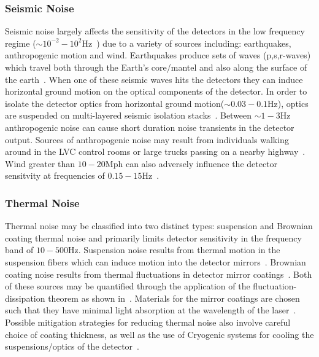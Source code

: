 \subsubsection{Seismic Noise}
%
Seismic noise largely affects the sensitivity of the detectors in the 
low frequency regime ($\sim 10^{-2} -
10^2$Hz~\cite{2012CQGra..29e5006M}) due to a variety of sources 
including: earthquakes, anthropogenic motion and wind. Earthquakes produce 
sets of 
waves (p,s,r-waves) which travel both through the Earth's core/mantel and 
also along the surface of the earth~\cite{Pavlis2003}. 
When one of these seismic waves
hits the detectors they can induce horizontal ground motion on the 
optical components of the detector. In order to isolate the detector 
optics from horizontal ground motion($\sim 0.03 - 0.1$Hz), 
optics are suspended on 
multi-layered seismic isolation stacks~\cite{Matichard_2015}.  
Between $\sim 1 - 3$Hz anthropogenic noise can cause short duration noise 
transients in the detector output. Sources of anthropogenic noise may 
result from individuals walking around in the \ac{LVC} control rooms 
or large trucks passing on a nearby highway~\cite{abbott2016characterization}. 
Wind greater than $10 - 20$Mph can also adversely 
influence the detector sensitvity 
at frequencies of $0.15 - 15$Hz~\cite{Effler_2015}.

%
%
\subsubsection{Thermal Noise}
Thermal noise may be classified into two distinct types: suspension 
and Brownian coating thermal noise and primarily limits detector 
sensitivity in the frequency 
band of $10 - 500$Hz. Suspension noise results 
from thermal motion in the suspension fibers which can induce motion 
into the detector mirrors~\cite{Yamamoto_2002}. 
Brownian coating noise results from 
thermal fluctuations in detector mirror coatings~\cite{Crooks_2006}. 
Both of these sources may be quantified through the application 
of the fluctuation-dissipation theorem as shown in~\cite{Yamamoto_2002}. 
Materials for 
the mirror coatings are chosen such that they have minimal light 
absorption at the wavelength of the laser~\cite{PhysRevD.81.122001}. 
Possible mitigation strategies for reducing thermal noise 
also involve careful choice of coating thickness, as well as the 
use of Cryogenic systems for cooling the suspensions/optics of 
the detector~\cite{2012CQGra..29l4007S}.

